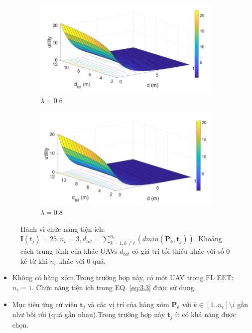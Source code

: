 \documentclass[11pt,openany]{book}
\begin{document}
\begin{algorimth}[H]
\begin{figure}[H]
\begin{subfigure}[H]{0.4\linewidth}
    \end{subfigure}
    \begin{subfigure}[H]{0.4\linewidth}
        \centering
        \includegraphics[width=\linewidth]{assets/3_8_c.png}
        \caption{{$\lambda=0.6$}}
        \label{fig:3.8c}
    \end{subfigure}
    \begin{subfigure}[H]{0.4\linewidth}
        \centering
        \includegraphics[width=\linewidth]{assets/3_8_d.png}
        \caption{{$\lambda=0.8$}}
        \label{fig:3.8d}
    \end{subfigure}
    \caption{{Hành vi chức năng tiện ích: $\mathbf{I}(t_j)=25, n_c=3, d_{tot} = \sum_{k=1, k\neq i}^{n_c}(dmin(\mathbf{P}_k,\mathbf{t}_j))$. Khoảng cách trung bình của khác UAVs $d_{tot}$ có giá trị tối thiểu khác với số 0 kể từ khi $n_c$ khác với 0 quá.}}
    \label{fig:3.8}
\end{figure}
\begin{itemize}
    \item Không có hàng xóm.Trong trường hợp này, có một UAV trong FL EET: $n_c=1$. Chức năng tiện ích trong EQ. \ref{eq:3.3} được sử dụng.
    \item Mục tiêu ứng cử viên $\mathbf{t}_j$ và các vị trí của hàng xóm $\mathbf{P}_k$ với $k \in [1..n_c]\setminus i$ gần như bối rối (quá gần nhau).Trong trường hợp này $\mathbf{t}_j$ ít có khả năng được chọn.

\end{itemize}
\end{algorimth}
\end{document}
